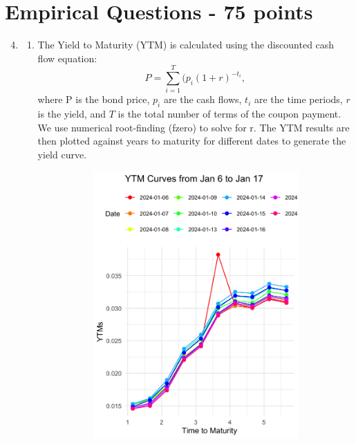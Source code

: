 \documentclass{article}
\begin{document}
\section*{Empirical Questions - 75 points} 

\begin{enumerate}
\setcounter{enumi}{3} 
    \item \hfill
    \begin{enumerate}
        \item  The Yield to Maturity (YTM) is calculated using the discounted cash flow equation: 
        $$P =\sum^T_{i=1}(p_i(1 + r)^{-t_i},$$ 
        where P is the bond price, $p_i$ are the cash flows, $t_i$ are the time periods, $r$ is the yield, and $T$ is the total number of terms of the coupon payment. We use numerical root-finding (fzero) to solve for r. The YTM results are then plotted against years to maturity for different dates to generate the yield curve.
        \begin{figure}[htbp]
            \centering
            \begin{subfigure}{0.4\textwidth}
                \centering
                \includegraphics[width=\textwidth]{yield_curve.png}

\end{subfigure}
\end{figure}
\end{enumerate}
\end{enumerate}
\end{document}
